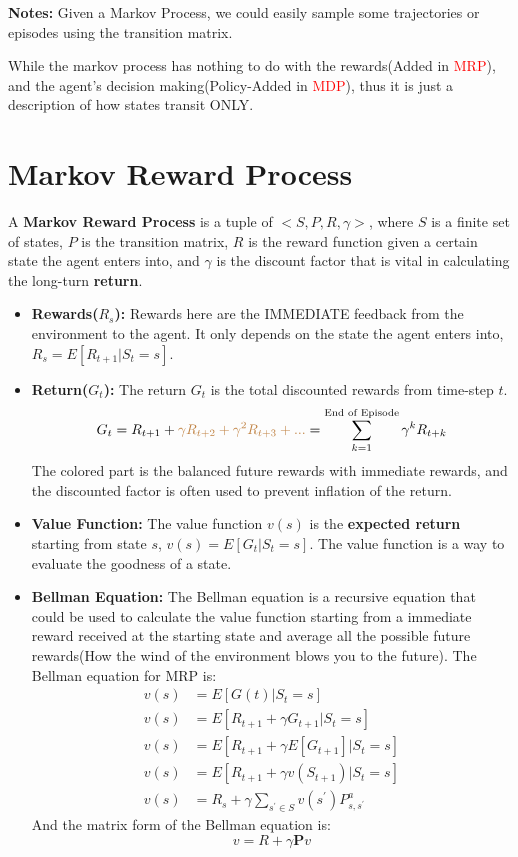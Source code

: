\documentclass{article}
\begin{document}
\vspace{2em}
\textbf{Notes:} Given a Markov Process, we could easily sample some trajectories or episodes using the transition matrix. 

While the markov process has nothing to do with the rewards(Added in \textcolor{red}{MRP}), and the agent's decision making(Policy-Added in \textcolor{red}{MDP}), 
thus it is just a description of how states transit ONLY.
\section{Markov Reward Process}
A \textbf{Markov Reward Process} is a tuple of $<S, P, R, \gamma>$, where $S$ is a finite set of states, $P$ is the transition matrix, $R$ is the reward function given
a certain state the agent enters into, and $\gamma$ is the discount factor that is vital in calculating the long-turn \textbf{return}.
\begin{itemize}
    \item \textbf{Rewards($R_s$):} Rewards here are the IMMEDIATE feedback from the environment to the agent. It only depends
    on the state the agent enters into, $R_s = E[R_{t+1}|S_t = s]$. 
    \item \textbf{Return($G_t$):} The return $G_t$ is the total discounted rewards from time-step $t$. 
    $$G_t = R_{t+1} + \textcolor{brown}{\gamma R_{t+2} + \gamma^2 R_{t+3} + ... } = \sum_{k=1}^{\text{End of Episode}} \gamma^k R_{t+k}$$
    The colored part is the balanced future rewards with immediate rewards, and the discounted factor is often used to prevent inflation of the return.
    \item \textbf{Value Function:} The value function $v(s)$ is the \textbf{expected return} starting from state $s$, $v(s) = E[G_t|S_t = s]$. The value function is a way to evaluate
    the goodness of a state.
    \item \textbf{Bellman Equation:} The Bellman equation is a recursive equation that could be used to calculate
    the value function starting from a immediate reward received at the starting state and average all the possible 
    future rewards(How the wind of the environment blows you to the future). The Bellman equation for MRP is:
    \begin{equation*}
        \begin{aligned}
        v(s) &= E[G(t)|S_t = s] \\
        v(s) &= E[R_{t+1} + \gamma G_{t+1}|S_t = s] \\
        v(s) &= E[R_{t+1} + \gamma E[G_{t+1}]|S_t = s] \\
        v(s) &= E[R_{t+1} + \gamma v(S_{t+1})|S_t = s] \\
        v(s) &= R_s + \gamma \sum_{s^{'}\in S}v(s^{'})P^a_{s,s^{'}}
        \end{aligned}
    \end{equation*}
    And the matrix form of the Bellman equation is:
    \begin{equation}
        v = R + \gamma \mathbf{P}v
    \end{equation}
\end{itemize}
\end{document}
